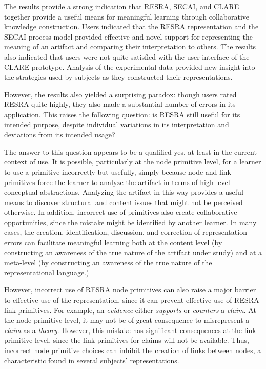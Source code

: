 The results provide a strong indication that RESRA, SECAI, and CLARE
together provide a useful means for meaningful learning through
collaborative knowledge construction.  Users indicated that the RESRA
representation and the SECAI process model provided effective and novel
support for representing the meaning of an artifact and comparing their
interpretation to others. The results also indicated that users were not
quite satisfied with the user interface of the CLARE prototype. Analysis
of the experimental data provided new insight into the strategies used by
subjects as they constructed their representations.

However, the results also yielded a surprising paradox: though users rated
RESRA quite highly, they also made a substantial number of errors in its
application.  This raises the following question: is RESRA still useful for
its intended purpose, despite individual variations in its interpretation
and deviations from its intended usage?

The answer to this question appears to be a qualified yes, at least in the
current context of use. It is possible, particularly at the node primitive
level, for a learner to use a primitive incorrectly but usefully, simply
because node and link primitives force the learner to analyze the artifact
in terms of high level conceptual abstractions.  Analyzing the artifact in
this way provides a useful means to discover structural and content issues
that might not be perceived otherwise. In addition, incorrect use of
primitives also create collaborative opportunities, since the mistake might
be identified by another learner.  In many cases, the creation,
identification, discussion, and correction of representation errors can
facilitate meaningful learning both at the content level (by constructing
an awareness of the true nature of the artifact under study) and at a
meta-level (by constructing an awareness of the true nature of the
representational language.)

However, incorrect use of RESRA node primitives can also raise a major
barrier to effective use of the representation, since it can prevent
effective use of RESRA link primitives.  For example, an {\em evidence\/}
either {\it supports\/} or {\it counters} a {\em claim}.  At the node
primitive level, it may not be of great consequence to misrepresent a {\em
claim\/} as a {\it theory\/}.  However, this mistake has significant
consequences at the link primitive level, since the link primitives for
claims will not be available.  Thus, incorrect node primitive choices
can inhibit the creation of links between nodes, a characteristic found in
several subjects' representations.

